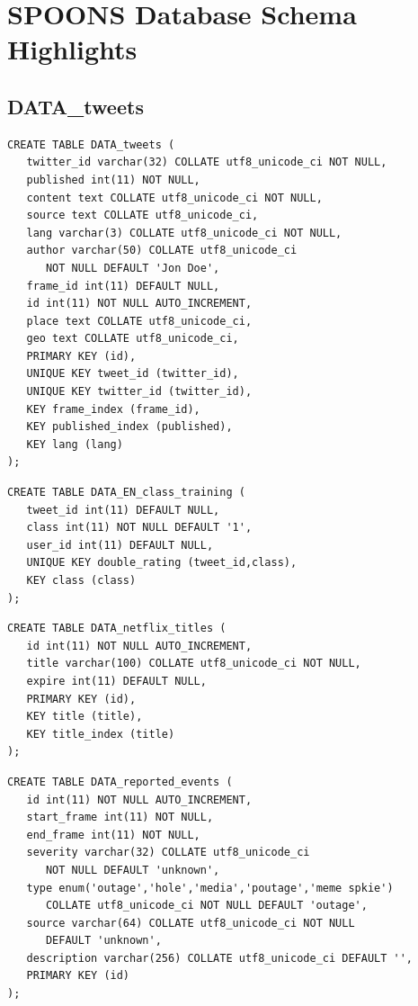 \documentclass[12pt]{ucthesis}
\begin{document}

\clearpage



\appendix
\chapter{SPOONS Database Schema Highlights}
\label{appendix-db-schema}

\section{DATA\_tweets}
\begin{lstlisting}
CREATE TABLE DATA_tweets (
   twitter_id varchar(32) COLLATE utf8_unicode_ci NOT NULL,
   published int(11) NOT NULL,
   content text COLLATE utf8_unicode_ci NOT NULL,
   source text COLLATE utf8_unicode_ci,
   lang varchar(3) COLLATE utf8_unicode_ci NOT NULL,
   author varchar(50) COLLATE utf8_unicode_ci
      NOT NULL DEFAULT 'Jon Doe',
   frame_id int(11) DEFAULT NULL,
   id int(11) NOT NULL AUTO_INCREMENT,
   place text COLLATE utf8_unicode_ci,
   geo text COLLATE utf8_unicode_ci,
   PRIMARY KEY (id),
   UNIQUE KEY tweet_id (twitter_id),
   UNIQUE KEY twitter_id (twitter_id),
   KEY frame_index (frame_id),
   KEY published_index (published),
   KEY lang (lang)
);
\end{lstlisting}

\begin{lstlisting}
CREATE TABLE DATA_EN_class_training (
   tweet_id int(11) DEFAULT NULL,
   class int(11) NOT NULL DEFAULT '1',
   user_id int(11) DEFAULT NULL,
   UNIQUE KEY double_rating (tweet_id,class),
   KEY class (class)
);
\end{lstlisting}

\begin{lstlisting}
CREATE TABLE DATA_netflix_titles (
   id int(11) NOT NULL AUTO_INCREMENT,
   title varchar(100) COLLATE utf8_unicode_ci NOT NULL,
   expire int(11) DEFAULT NULL,
   PRIMARY KEY (id),
   KEY title (title),
   KEY title_index (title)
);
\end{lstlisting}

\begin{lstlisting}
CREATE TABLE DATA_reported_events (
   id int(11) NOT NULL AUTO_INCREMENT,
   start_frame int(11) NOT NULL,
   end_frame int(11) NOT NULL,
   severity varchar(32) COLLATE utf8_unicode_ci
      NOT NULL DEFAULT 'unknown',
   type enum('outage','hole','media','poutage','meme spkie')
      COLLATE utf8_unicode_ci NOT NULL DEFAULT 'outage',
   source varchar(64) COLLATE utf8_unicode_ci NOT NULL
      DEFAULT 'unknown',
   description varchar(256) COLLATE utf8_unicode_ci DEFAULT '',
   PRIMARY KEY (id)
);
\end{lstlisting}
\end{document}
